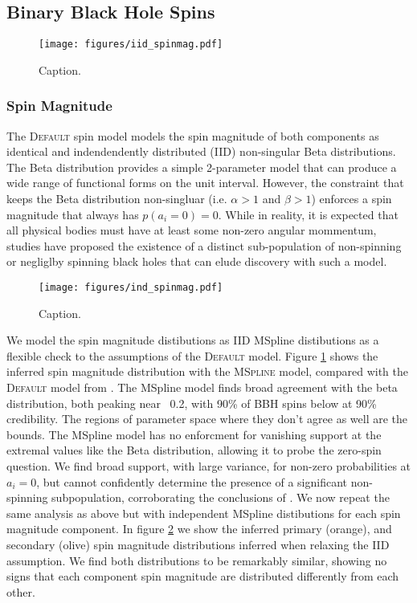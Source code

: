 \subsection{Binary Black Hole Spins} \label{sec:spin_dist}

\begin{figure}
    \texttt{[image: figures/iid\_spinmag.pdf]}
    \caption{Caption.}
    \label{fig:iid_spinmag_dist}
\end{figure}

\subsubsection{Spin Magnitude}

The \textsc{Default} spin model models the spin magnitude of both components as identical and indendendently distributed (IID) non-singular Beta distributions. The
Beta distribution provides a simple 2-parameter model that can produce a wide range of functional forms on the unit interval. However, the constraint that keeps 
the Beta distribution non-singluar (i.e. $\alpha>1$ and $\beta>1$) enforces a spin magnitude that always has $p(a_i=0) = 0$. While in reality, it is expected that 
all physical bodies must have at least some non-zero angular mommentum, studies have proposed the existence of a distinct sub-population of non-spinning or 
negliglby spinning black holes that can elude discovery with such a model. 

\begin{figure}
    \texttt{[image: figures/ind\_spinmag.pdf]}
    \caption{Caption.}
    \label{fig:ind_spinmag_dist}
\end{figure}

We model the spin magnitude distibutions as IID MSpline distibutions as a flexible check
to the assumptions of the \textsc{Default} model. Figure \ref{fig:iid_spinmag_dist} shows the inferred spin magnitude distribution with the \textsc{MSpline} model, 
compared with the \textsc{Default} model from \citet{o3b_astro_dist}. The MSpline model finds broad agreement with the beta distribution, both peaking near ~0.2, with 90\% 
of BBH spins below \result{$\CIPlusMinus{\macros[MSplineIIDCompSpins][a_90percentile]}$} at 90\% credibility. The regions of parameter space where they don't agree as well are the bounds. 
The MSpline model has no enforcment for vanishing support at the extremal values like the Beta distribution, 
allowing it to probe the zero-spin question. We find broad support, with large variance, for non-zero probabilities at $a_i=0$, but cannot confidently determine the presence of 
a significant non-spinning subpopulation, corroborating the conclusions of \citet{BuildBetterSpinModels,Callister_NoEvidence,GWTC3MonashSpin}. 
We now repeat the same analysis as above but with independent MSpline distibutions for each spin magnitude component. In figure \ref{fig:ind_spinmag_dist} 
we show the inferred primary (orange), and secondary (olive) spin magnitude distributions inferred when relaxing the IID assumption. We find both 
distributions to be remarkably similar, showing no signs that each component spin magnitude are distributed differently from each other.

